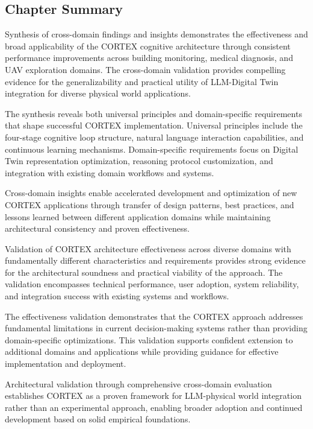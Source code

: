 \subsection{Chapter Summary}

Synthesis of cross-domain findings and insights demonstrates the effectiveness and broad applicability of the CORTEX cognitive architecture through consistent performance improvements across building monitoring, medical diagnosis, and UAV exploration domains. The cross-domain validation provides compelling evidence for the generalizability and practical utility of LLM-Digital Twin integration for diverse physical world applications.

The synthesis reveals both universal principles and domain-specific requirements that shape successful CORTEX implementation. Universal principles include the four-stage cognitive loop structure, natural language interaction capabilities, and continuous learning mechanisms. Domain-specific requirements focus on Digital Twin representation optimization, reasoning protocol customization, and integration with existing domain workflows and systems.

Cross-domain insights enable accelerated development and optimization of new CORTEX applications through transfer of design patterns, best practices, and lessons learned between different application domains while maintaining architectural consistency and proven effectiveness.

Validation of CORTEX architecture effectiveness across diverse domains with fundamentally different characteristics and requirements provides strong evidence for the architectural soundness and practical viability of the approach. The validation encompasses technical performance, user adoption, system reliability, and integration success with existing systems and workflows.

The effectiveness validation demonstrates that the CORTEX approach addresses fundamental limitations in current decision-making systems rather than providing domain-specific optimizations. This validation supports confident extension to additional domains and applications while providing guidance for effective implementation and deployment.

Architectural validation through comprehensive cross-domain evaluation establishes CORTEX as a proven framework for LLM-physical world integration rather than an experimental approach, enabling broader adoption and continued development based on solid empirical foundations.

